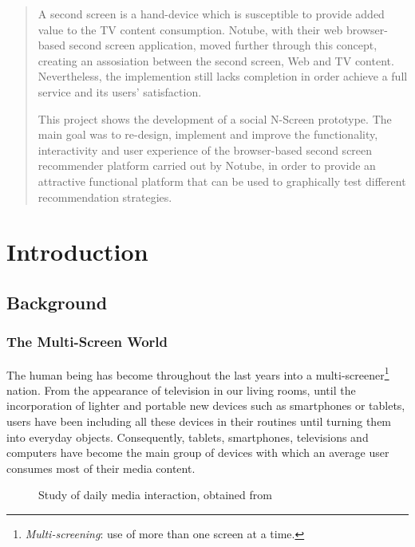 \documentclass{acm_proc_article-sp}
\begin{document}
\maketitle
\begin{abstract}
A second screen is a hand-device which is susceptible to provide added value to the TV content consumption. Notube, with their web browser-based second screen application, moved further through this concept, creating an assosiation between the second screen, Web and TV content. Nevertheless, the implemention still lacks completion in order achieve a full service and its users' satisfaction.

This project shows the development of a social N-Screen prototype. The main goal was to re-design, implement and improve the functionality, interactivity and user experience of the browser-based second screen recommender platform carried out by Notube, in order to provide an attractive functional platform that can be used to graphically test different recommendation strategies. 
\end{abstract}

\section{Introduction}

\subsection{Background}

\subsubsection{The Multi-Screen World}

The human being has become throughout the last years into a multi-screener\footnote{\textit{Multi-screening}: use of 
more than one screen at a time.} nation. From the appearance of television in our living rooms, until the incorporation of lighter and portable new devices such as smartphones or tablets, users have been including all these devices in their routines until turning them into everyday objects. Consequently, tablets, smartphones, televisions and computers have become the main group of devices with which an average user consumes most of their media content\cite{multiscreen:google}. 

\begin{figure}[!htb]
\centering
{}
\caption{Study of daily media interaction, obtained from \cite{multiscreen:google}}
\end{figure}
\end{document}
